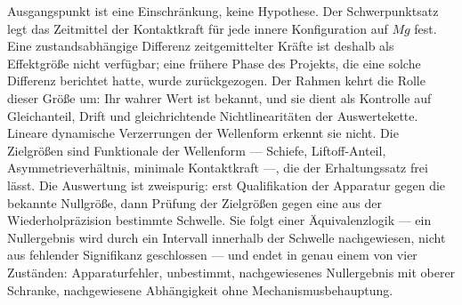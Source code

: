 \documentclass[12pt,a4paper]{report}
\begin{document}
Ausgangspunkt ist eine Einschränkung, keine Hypothese. Der
Schwerpunktsatz legt das Zeitmittel der Kontaktkraft für jede innere
Konfiguration auf $Mg$ fest. Eine zustandsabhängige Differenz
zeitgemittelter Kräfte ist deshalb als Effektgröße nicht verfügbar; eine
frühere Phase des Projekts, die eine solche Differenz berichtet hatte,
wurde zurückgezogen. Der Rahmen kehrt die Rolle dieser Größe um: Ihr
wahrer Wert ist bekannt, und sie dient als Kontrolle auf Gleichanteil,
Drift und gleichrichtende Nichtlinearitäten der Auswertekette. Lineare
dynamische Verzerrungen der Wellenform erkennt sie nicht. Die Zielgrößen sind Funktionale der
Wellenform --- Schiefe, Liftoff-Anteil, Asymmetrieverhältnis, minimale
Kontaktkraft ---, die der Erhaltungssatz frei lässt. Die Auswertung ist
zweispurig: erst Qualifikation der Apparatur gegen die bekannte
Nullgröße, dann Prüfung der Zielgrößen gegen eine aus der
Wiederholpräzision bestimmte Schwelle. Sie folgt einer Äquivalenzlogik --- ein
Nullergebnis wird durch ein Intervall innerhalb der Schwelle
nachgewiesen, nicht aus fehlender Signifikanz geschlossen --- und endet
in genau einem von vier Zuständen: Apparaturfehler, unbestimmt,
nachgewiesenes Nullergebnis mit oberer Schranke, nachgewiesene
Abhängigkeit ohne Mechanismusbehauptung.
\end{document}
